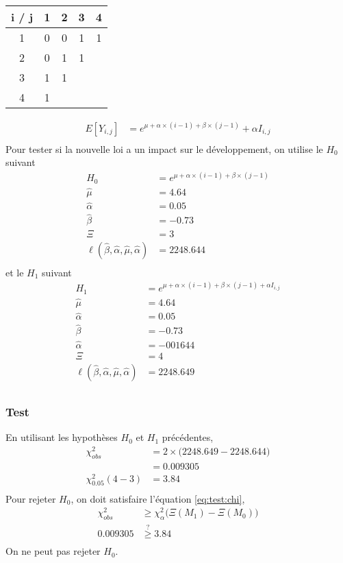 \begin{itemize}
\begin{center}
\begin{tabular}{|c|c|c|c|c|}
  \hline
   i / j & 1 & 2 & 3 & 4\\ 
  \hline
  1 & 0 & 0 & 1 & 1  \\
  2 & 0 & 1 & 1 &  \\
  3 & 1 & 1 & &   \\
  4 & 1 &  &  &  \\
  \hline
\end{tabular}
\end{center}
\bigskip
\begin{align*}
E[Y_{i,j}] &= e^{\mu + \alpha\times(i-1) + \beta \times (j-1)} + \alpha I_{i,j} \\
\end{align*}
Pour tester si la nouvelle loi a un impact sur le développement, on utilise le $H_0$ suivant
\begin{align*}
H_0 &= e^{\mu + \alpha\times(i-1) + \beta \times (j-1)} \\
\widehat{\mu} &= 4.64 \\
\widehat{\alpha} &= 0.05 \\
\widehat{\beta} &= -0.73 \\
\Xi &= 3 \\
\ell(\widehat{\beta}, \widehat{\alpha}, \widehat{\mu}, \widehat{\alpha}) & = 2248.644 \\
\end{align*}
et le $H_1$ suivant
\begin{align*}
H_1 &= e^{\mu + \alpha\times(i-1) + \beta \times (j-1) + \alpha I_{i,j}} \\
\widehat{\mu} &= 4.64 \\
\widehat{\alpha} &= 0.05 \\
\widehat{\beta} &= -0.73 \\
\widehat{\alpha} &= -001644 \\
\Xi &= 4 \\
\ell(\widehat{\beta}, \widehat{\alpha}, \widehat{\mu}, \widehat{\alpha}) & = 2248.649 \\
\end{align*}
\subsubsection*{Test}
En utilisant les hypothèses $H_0$ et $H_1$ précédentes,
\begin{align*}
\chi_{obs}^2 &= 2 \times \Big( 2248.649-2248.644 \Big) \\
&= 0.009305 \\
\chi_{0.05}^2(4 - 3) &= 3.84 \\
\end{align*}
Pour rejeter $H_0$, on doit satisfaire l'équation \ref{eq:test:chi},
\begin{align*}
\chi_{obs}^2 &\geq \chi_{\alpha}^2\Big( \Xi (M_1) - \Xi (M_0) \Big) \\
0.009305 &\overset{?}{\geq} 3.84\\
\end{align*}
On ne peut pas rejeter $H_0$.
\bigskip
\end{itemize}

